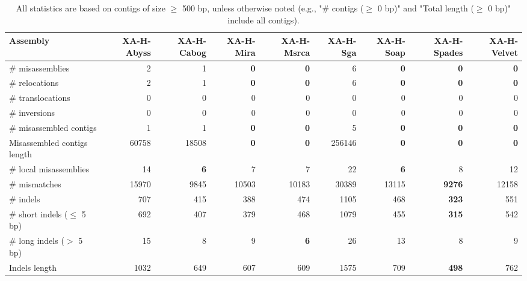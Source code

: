 \documentclass[12pt,a4paper]{article}
\begin{document}
\begin{table}[ht]
\begin{center}
\caption{All statistics are based on contigs of size $\geq$ 500 bp, unless otherwise noted (e.g., "\# contigs ($\geq$ 0 bp)" and "Total length ($\geq$ 0 bp)" include all contigs).}
\begin{tabular}{|l*{8}{|r}|}
\hline
Assembly & XA-H-Abyss & XA-H-Cabog & XA-H-Mira & XA-H-Msrca & XA-H-Sga & XA-H-Soap & XA-H-Spades & XA-H-Velvet \\ \hline
\# misassemblies & 2 & 1 & {\bf 0} & {\bf 0} & 6 & {\bf 0} & {\bf 0} & {\bf 0} \\ \hline
\hspace{5mm}\# relocations & 2 & 1 & {\bf 0} & {\bf 0} & 6 & {\bf 0} & {\bf 0} & {\bf 0} \\ \hline
\hspace{5mm}\# translocations & 0 & 0 & 0 & 0 & 0 & 0 & 0 & 0 \\ \hline
\hspace{5mm}\# inversions & 0 & 0 & 0 & 0 & 0 & 0 & 0 & 0 \\ \hline
\# misassembled contigs & 1 & 1 & {\bf 0} & {\bf 0} & 5 & {\bf 0} & {\bf 0} & {\bf 0} \\ \hline
Misassembled contigs length & 60758 & 18508 & {\bf 0} & {\bf 0} & 256146 & {\bf 0} & {\bf 0} & {\bf 0} \\ \hline
\# local misassemblies & 14 & {\bf 6} & 7 & 7 & 22 & {\bf 6} & 8 & 12 \\ \hline
\# mismatches & 15970 & 9845 & 10503 & 10183 & 30389 & 13115 & {\bf 9276} & 12158 \\ \hline
\# indels & 707 & 415 & 388 & 474 & 1105 & 468 & {\bf 323} & 551 \\ \hline
\hspace{5mm}\# short indels ($\leq$ 5 bp) & 692 & 407 & 379 & 468 & 1079 & 455 & {\bf 315} & 542 \\ \hline
\hspace{5mm}\# long indels ($>$ 5 bp) & 15 & 8 & 9 & {\bf 6} & 26 & 13 & 8 & 9 \\ \hline
Indels length & 1032 & 649 & 607 & 609 & 1575 & 709 & {\bf 498} & 762 \\ \hline
\end{tabular}
\end{center}
\end{table}
\end{document}
